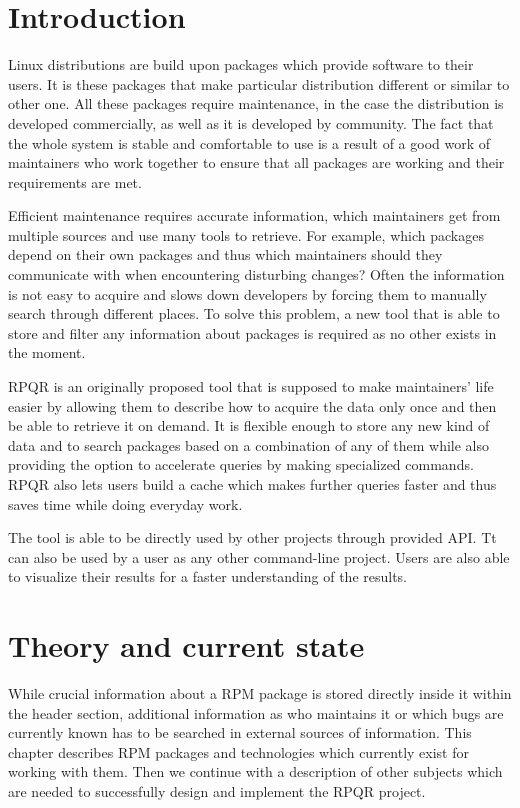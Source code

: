 \setlength{\parindent}{0em}
\setlength{\parskip}{1em}
\chapter{Introduction}

Linux distributions are build upon packages which provide software to their users. It is these
packages that make particular distribution different or similar to other one. All these packages require
maintenance, in the case the distribution is developed commercially, as well as it is developed by community.
The fact that the whole system is stable and comfortable to use is a result of a good work of
maintainers who work together to ensure that all packages are working and their
requirements are met.

Efficient maintenance requires accurate information, which maintainers get from multiple sources
and use many tools to retrieve. For example, which packages depend on their own packages and thus which
maintainers should they communicate with when encountering disturbing changes? Often the information
is not easy to acquire and slows down developers by forcing them to manually search through different
places. To solve this problem, a new tool that is able to store and filter any information about
packages is required as no other exists in the moment.

RPQR is an originally proposed tool that is supposed to make maintainers' life easier by allowing them to describe how
to acquire the data only once and then be able to retrieve it on demand. It is flexible
enough to store any new kind of data and to search packages based on a combination of any of them while
also providing the option to accelerate queries by making specialized commands.
RPQR also lets users build a cache which makes further queries faster and thus saves time while
doing everyday work.

The tool is able to be directly used by other projects through provided API. Tt can also be used
by a user as any other command-line project. Users are also able to visualize their
results for a faster understanding of the results.

\chapter{Theory and current state}
While crucial information about a RPM package is stored directly inside it within the header section,
additional information as who maintains it or which bugs are currently known has to be searched
in external sources of information. This chapter describes RPM packages and technologies which
currently exist for working with them. Then we continue with a description of other subjects which are needed
to successfully design and implement the RPQR project.

